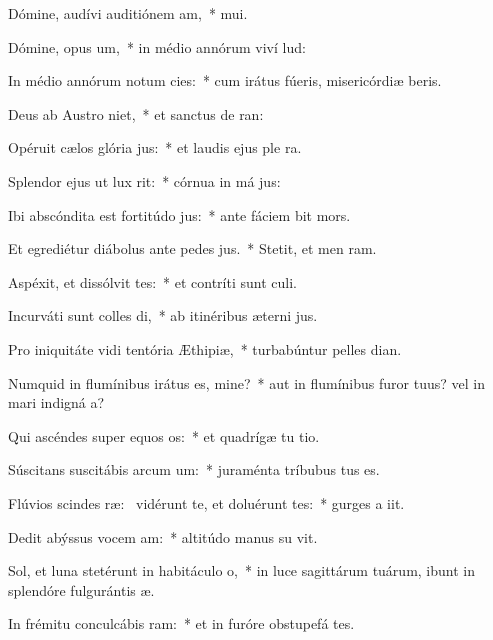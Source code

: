 \item Dómine, audívi auditiónem am,~*  mui.
\item Dómine, opus um,~* in médio annórum viví lud:
\item In médio annórum notum cies:~* cum irátus fúeris, misericórdiæ beris.
\item Deus ab Austro niet,~* et sanctus de  ran:
\item Opéruit cælos glória jus:~* et laudis ejus ple  ra.
\item Splendor ejus ut lux rit:~* córnua in má jus:
\item Ibi abscóndita est fortitúdo jus:~* ante fáciem  bit mors.
\item Et egrediétur diábolus ante pedes jus.~* Stetit, et men  ram.
\item Aspéxit, et dissólvit tes:~* et contríti sunt  culi.
\item Incurváti sunt colles di,~* ab itinéribus æterni jus.
\item Pro iniquitáte vidi tentória Æthipiæ,~* turbabúntur pelles  dian.
\item Numquid in flumínibus irátus es, mine?~* aut in flumínibus furor tuus? vel in mari indigná a?
\item Qui ascéndes super equos os:~* et quadrígæ tu tio.
\item Súscitans suscitábis arcum um:~* juraménta tríbubus  tus es.
\item Flúvios scindes ræ:~\pscross{} vidérunt te, et doluérunt tes:~* gurges a iit.
\item Dedit abýssus vocem am:~* altitúdo manus su vit.
\item Sol, et luna stetérunt in habitáculo o,~* in luce sagittárum tuárum, ibunt in splendóre fulgurántis  æ.
\item In frémitu conculcábis ram:~* et in furóre obstupefá tes.
